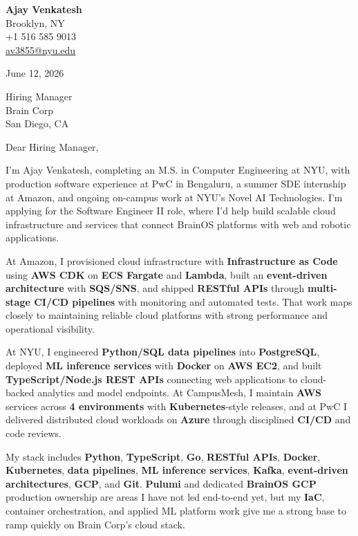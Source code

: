 \documentclass[letterpaper,11pt]{article}
\begin{document}
\begin{flushleft}
\textbf{\large Ajay Venkatesh} \\
Brooklyn, NY \\
+1 516 585 9013 \\
\href{mailto:av3855@nyu.edu}{av3855@nyu.edu}
\end{flushleft}
\vspace{10pt}
June 12, 2026
\vspace{6pt}

Hiring Manager \\
Brain Corp \\
San Diego, CA

\vspace{10pt}

Dear Hiring Manager,

I'm Ajay Venkatesh, completing an M.S. in Computer Engineering at NYU, with production software experience at PwC in Bengaluru, a summer SDE internship at Amazon, and ongoing on-campus work at NYU's Novel AI Technologies. I'm applying for the Software Engineer II role, where I'd help build scalable cloud infrastructure and services that connect BrainOS platforms with web and robotic applications.

At Amazon, I provisioned cloud infrastructure with \textbf{Infrastructure as Code} using \textbf{AWS CDK} on \textbf{ECS Fargate} and \textbf{Lambda}, built an \textbf{event-driven architecture} with \textbf{SQS/SNS}, and shipped \textbf{RESTful APIs} through \textbf{multi-stage CI/CD pipelines} with monitoring and automated tests. That work maps closely to maintaining reliable cloud platforms with strong performance and operational visibility.

At NYU, I engineered \textbf{Python/SQL data pipelines} into \textbf{PostgreSQL}, deployed \textbf{ML inference services} with \textbf{Docker} on \textbf{AWS EC2}, and built \textbf{TypeScript/Node.js REST APIs} connecting web applications to cloud-backed analytics and model endpoints. At CampusMesh, I maintain \textbf{AWS} services across \textbf{4 environments} with \textbf{Kubernetes}-style releases, and at PwC I delivered distributed cloud workloads on \textbf{Azure} through disciplined \textbf{CI/CD} and code reviews.

My stack includes \textbf{Python}, \textbf{TypeScript}, \textbf{Go}, \textbf{RESTful APIs}, \textbf{Docker}, \textbf{Kubernetes}, \textbf{data pipelines}, \textbf{ML inference services}, \textbf{Kafka}, \textbf{event-driven architectures}, \textbf{GCP}, and \textbf{Git}. \textbf{Pulumi} and dedicated \textbf{BrainOS GCP} production ownership are areas I have not led end-to-end yet, but my \textbf{IaC}, container orchestration, and applied ML platform work give me a strong base to ramp quickly on Brain Corp's cloud stack.
\end{document}
